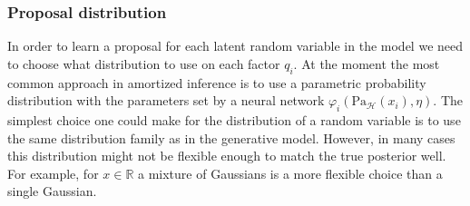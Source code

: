 \documentclass[12pt]{article}
\begin{document}

% 



\subsubsection*{Proposal distribution}

In order to learn a proposal for each latent random variable in the model we need to choose what distribution to use on each factor $q_i$.
At the moment the most common approach in amortized inference is to use a parametric probability distribution with the parameters set by a neural network $\varphi_i(\text{Pa}_\mathcal{H}(x_i), \eta)$.
The simplest choice one could make for the distribution of a random variable is to use the same distribution family as in the generative model.
However, in many cases this distribution might not be flexible enough to match the true posterior well.
For example, for $x \in \mathbb{R}$ a mixture of Gaussians is a more flexible choice than a single Gaussian.
\end{document}
